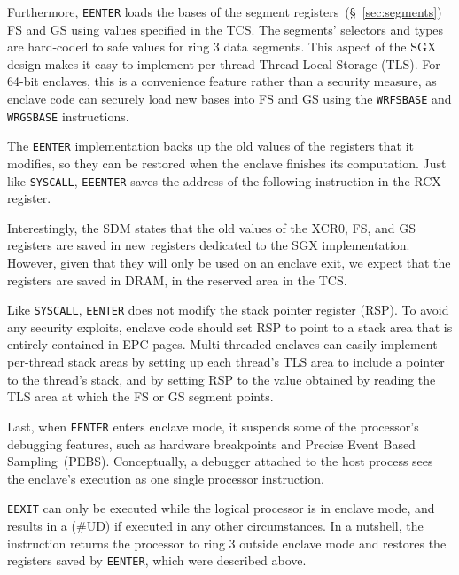 Furthermore, \texttt{EENTER} loads the bases of the segment
registers~(\S~\ref{sec:segments}) FS and GS using values specified in the TCS.
The segments' selectors and types are hard-coded to safe values for ring 3 data
segments. This aspect of the SGX design makes it easy to implement per-thread
Thread Local Storage (TLS). For 64-bit enclaves, this is a convenience feature
rather than a security measure, as enclave code can securely load new bases
into FS and GS using the \texttt{WRFSBASE} and \texttt{WRGSBASE} instructions.

The \texttt{EENTER} implementation backs up the old values of the registers
that it modifies, so they can be restored when the enclave finishes its
computation. Just like \texttt{SYSCALL}, \texttt{EEENTER} saves the address of
the following instruction in the RCX register.

Interestingly, the SDM states that the old values of the XCR0, FS, and GS
registers are saved in new registers dedicated to the SGX implementation.
However, given that they will only be used on an enclave exit, we expect that
the registers are saved in DRAM, in the reserved area in the TCS.

Like \texttt{SYSCALL}, \texttt{EENTER} does not modify the stack pointer
register (RSP). To avoid any security exploits, enclave code should set RSP to
point to a stack area that is entirely contained in EPC pages. Multi-threaded
enclaves can easily implement per-thread stack areas by setting up each
thread's TLS area to include a pointer to the thread's stack, and by setting
RSP to the value obtained by reading the TLS area at which the FS or GS segment
points.

Last, when \texttt{EENTER} enters enclave mode, it suspends some of the
processor's debugging features, such as hardware breakpoints and Precise Event
Based Sampling~(PEBS). Conceptually, a debugger attached to the host process
sees the enclave's execution as one single processor instruction.


\label{sec:sgx_eexit}


\texttt{EEXIT} can only be executed while the logical processor is in enclave
mode, and results in a (\#UD) if executed in any other circumstances. In a
nutshell, the instruction returns the processor to ring 3 outside enclave mode
and restores the registers saved by \texttt{EENTER}, which were described above.

